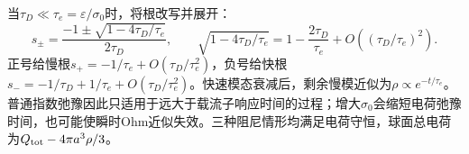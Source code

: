 \begin{solution}
当$\tau_D\ll\tau_e=\varepsilon/\sigma_0$时，将根改写并展开：
\[s_\pm=\frac{-1\pm\sqrt{1-4\tau_D/\tau_e}}{2\tau_D},\qquad
\sqrt{1-4\tau_D/\tau_e}=1-\frac{2\tau_D}{\tau_e}+O((\tau_D/\tau_e)^2).\]
正号给慢根$s_+=-1/\tau_e+O(\tau_D/\tau_e^2)$，负号给快根$s_-=-1/\tau_D+1/\tau_e+O(\tau_D/\tau_e^2)$。快速模态衰减后，剩余慢模近似为$\rho\propto e^{-t/\tau_e}$。普通指数弛豫因此只适用于远大于载流子响应时间的过程；增大$\sigma_0$会缩短电荷弛豫时间，也可能使瞬时Ohm近似失效。三种阻尼情形均满足电荷守恒，球面总电荷为$Q_{\rm tot}-4\pi a^3\rho/3$。
\end{solution}


